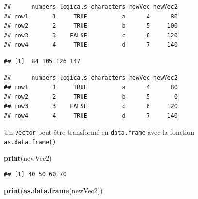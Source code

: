 \documentclass[]{book}
\newenvironment{Shaded}{\begin{snugshade}}{\end{snugshade}}
\newcommand{\KeywordTok}[1]{\textcolor[rgb]{0.13,0.29,0.53}{\textbf{#1}}}
\newcommand{\DecValTok}[1]{\textcolor[rgb]{0.00,0.00,0.81}{#1}}
\newcommand{\StringTok}[1]{\textcolor[rgb]{0.31,0.60,0.02}{#1}}
\newcommand{\OperatorTok}[1]{\textcolor[rgb]{0.81,0.36,0.00}{\textbf{#1}}}
\newcommand{\NormalTok}[1]{#1}
\begin{document}
\begin{verbatim}
##      numbers logicals characters newVec newVec2
## row1       1     TRUE          a      4      80
## row2       2     TRUE          b      5     100
## row3       3    FALSE          c      6     120
## row4       4     TRUE          d      7     140
\end{verbatim}

\begin{Shaded}
\end{Shaded}

\begin{verbatim}
## [1]  84 105 126 147
\end{verbatim}

\begin{Shaded}
\end{Shaded}

\begin{verbatim}
##      numbers logicals characters newVec newVec2
## row1       1     TRUE          a      4      80
## row2       2     TRUE          b      5       0
## row3       3    FALSE          c      6     120
## row4       4     TRUE          d      7     140
\end{verbatim}

Un \texttt{vector} peut être transformé en \texttt{data.frame} avec la
fonction \texttt{as.data.frame()}.

\begin{Shaded}
\begin{Highlighting}[]
\KeywordTok{print}\NormalTok{(newVec2)}
\end{Highlighting}
\end{Shaded}

\begin{verbatim}
## [1] 40 50 60 70
\end{verbatim}

\begin{Shaded}
\begin{Highlighting}[]
\KeywordTok{print}\NormalTok{(}\KeywordTok{as.data.frame}\NormalTok{(newVec2))}
\end{Highlighting}
\end{Shaded}
\end{document}

